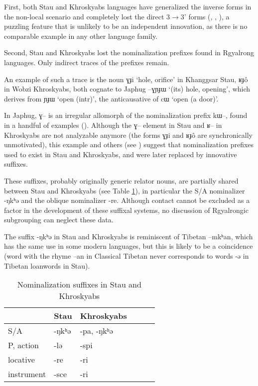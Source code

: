 \documentclass[oneside,a4paper,11pt]{article}
\newcommand{\ipa}[1]{{\phon #1}} %
\begin{document}
 First, both Stau and Khroskyabs languages have generalized the inverse forms in the non-local scenario and completely lost the direct 3$\rightarrow$3' forms (\citealt{lai13affixale}, \citealt{jacques14inverse},   \citealt{lai14person}), a puzzling feature that is unlikely to be an independent innovation, as there is no comparable example in any other language family.
 
 Second, Stau and Khroskyabs lost the nominalization prefixes found in Rgyalrong languages. Only indirect traces of the prefixes remain.
 
 An example of such a trace is the noun \ipa{ɣɟi}  `hole, orifice' in Khanggsar Stau,  \ipa{ʁɟô} in Wobzi Khroskyabs, both   cognate to Japhug \ipa{--ɣɲɟɯ}  `(its) hole, opening', which  derives from \ipa{ɲɟɯ} `open (intr)', the anticausative of \ipa{cɯ} `open (a door)'. 
 
 In Japhug, \ipa{ɣ--} is an irregular allomorph of the nominalization prefix \ipa{kɯ--}, found in a handful of examples (\citealt[4-6]{jacques14antipassive}). Although the \ipa{ɣ--} element in Stau and \ipa{ʁ--} in Khroskyabs are not analyzable anymore (the forms \ipa{ɣɟi}  and   \ipa{ʁɟô} are synchronically unmotivated), this example and others (see \citealt[1228-9]{jacques12incorp}) suggest  that nominalization prefixes used to exist in Stau and Khroskyabs, and were later replaced by innovative suffixes.  
 
 These suffixes, probably originally generic relator nouns, are partially shared between Stau and Khroskyabs (see Table \ref{tab:nmlz}), in particular the S/A nominalizer \ipa{-ŋkʰə} and the oblique nominalizer \ipa{-re}. Although contact cannot be excluded as a factor in the development of these suffixal systems, no discussion of Rgyalrongic subgrouping can neglect these data. 
 
 The suffix \ipa{-ŋkʰə}  in Stau and Khroskyabs is reminiscent of Tibetan \ipa{--mkʰan}, which has the same use in some modern languages, but this is likely to be a coincidence (word with the rhyme \ipa{--an} in Classical Tibetan never corresponds to words \ipa{-ə} in Tibetan loanwords in Stau).
 
 
 
 
  \begin{table}[h]
  \caption{Nominalization suffixes in Stau and Khroskyabs} \label{tab:nmlz} \centering
 \begin{tabular}{llllll}
 \toprule
 &	Stau &	Khroskyabs &	\\	
 \midrule
S/A &	\ipa{-ŋkʰə} &	\ipa{-pa, -ŋkʰə} &	\\
P, action &	\ipa{-lə} &	\ipa{-spi} &	\\
locative &	\ipa{-re} &	\ipa{-ri} &	\\
instrument &	\ipa{-sce} &	\ipa{-ri} &	\\
\bottomrule
\end{tabular}
\end{table}
\end{document}
